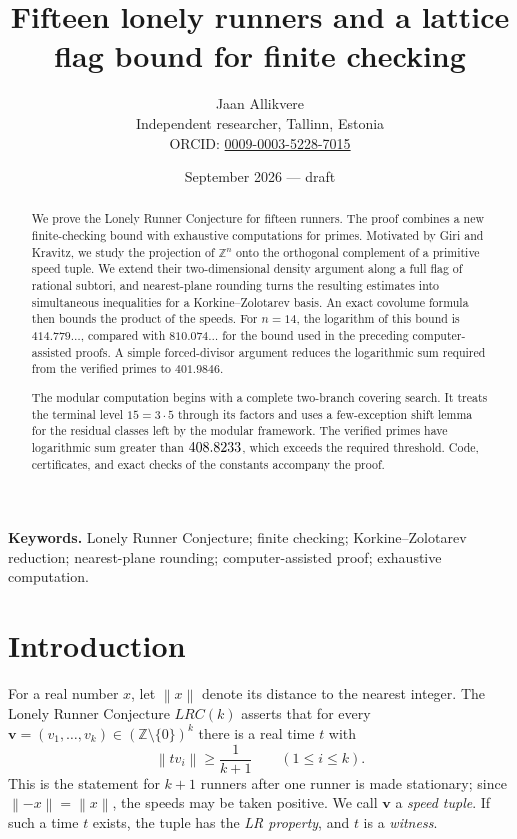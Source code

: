 \documentclass[11pt]{article}
\title{Fifteen lonely runners and a lattice flag bound for finite checking}
\author{Jaan Allikvere\\
\small Independent researcher, Tallinn, Estonia\\
\small ORCID: \href{https://orcid.org/0009-0003-5228-7015}{0009-0003-5228-7015}}
\date{September 2026 --- draft}
\theoremstyle{definition}
\theoremstyle{remark}
\newcommand{\Z}{\mathbb{Z}}
\newcommand{\vct}[1]{\mathbf{#1}}
\newcommand{\nearest}[1]{\left\lVert #1\right\rVert}
\newcommand{\TargetUB}{401.9846}          %
\begin{document}
\maketitle

\begin{abstract}
We prove the Lonely Runner Conjecture for fifteen runners.  The proof
combines a new finite-checking bound with exhaustive computations for
\GateCount{} primes.  Motivated by Giri and Kravitz, we study the
projection of $\Z^n$ onto the orthogonal complement of a primitive speed
tuple.  We extend their two-dimensional density argument along a full
flag of rational subtori, and nearest-plane
rounding turns the resulting estimates into simultaneous inequalities for
a Korkine--Zolotarev basis.  An exact covolume formula then bounds the
product of the speeds.  For $n=14$, the logarithm of this bound is
$414.779\ldots$, compared with $810.074\ldots$ for the bound used in the
preceding computer-assisted proofs.  A simple forced-divisor argument
reduces the logarithmic sum required from the verified primes to
$\TargetUB$.

The modular computation begins with a complete two-branch covering search.
It treats the terminal level $15=3\cdot5$ through its factors and uses a
few-exception shift lemma for the residual classes left by the modular
framework.  The verified primes have
logarithmic sum greater than $408.8233$, which exceeds the required
threshold.  Code, certificates, and exact checks of the constants accompany
the proof.
\end{abstract}

\medskip
\noindent\textbf{Keywords.}
Lonely Runner Conjecture; finite checking; Korkine--Zolotarev reduction;
nearest-plane rounding; computer-assisted proof; exhaustive computation.

\section{Introduction}

For a real number $x$, let $\nearest{x}$ denote its distance to the nearest
integer.  The Lonely Runner Conjecture $LRC(k)$ asserts that for every
$\vct{v}=(v_1,\ldots,v_k)\in(\Z\setminus\{0\})^k$ there is a real time $t$
with
\begin{equation}\label{eq:lrc}
  \nearest{t v_i}\geq \frac{1}{k+1}\qquad(1\leq i\leq k).
\end{equation}
This is the statement for $k+1$ runners after one runner is made
stationary; since $\nearest{-x}=\nearest{x}$, the speeds may be taken
positive.  We call $\vct{v}$ a \emph{speed tuple}.  If such a time $t$
exists, the tuple has the \emph{LR property}, and $t$ is a \emph{witness}.
\end{document}
